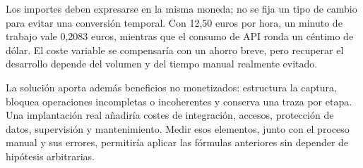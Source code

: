 Los importes deben expresarse en la misma moneda; no se fija un tipo de cambio para evitar una conversión temporal. Con 12,50 euros por hora, un minuto de trabajo vale 0,2083 euros, mientras que el consumo de API ronda un céntimo de dólar. El coste variable se compensaría con un ahorro breve, pero recuperar el desarrollo depende del volumen y del tiempo manual realmente evitado.

La solución aporta además beneficios no monetizados: estructura la captura, bloquea operaciones incompletas o incoherentes y conserva una traza por etapa. Una implantación real añadiría costes de integración, accesos, protección de datos, supervisión y mantenimiento. Medir esos elementos, junto con el proceso manual y sus errores, permitiría aplicar las fórmulas anteriores sin depender de hipótesis arbitrarias.
